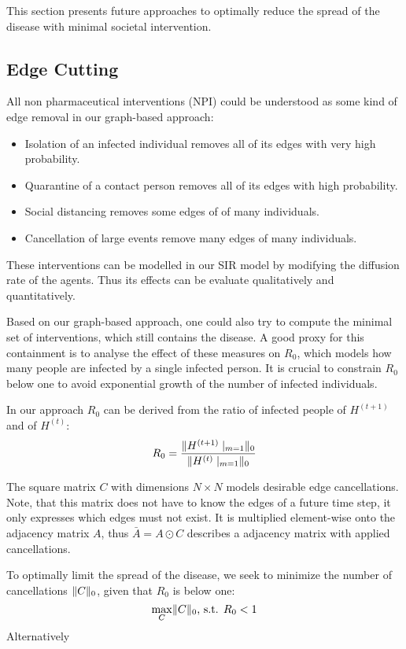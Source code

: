 This section presents future approaches to optimally reduce the spread of the disease with minimal societal intervention.

\subsection{Edge Cutting}
All non pharmaceutical interventions (NPI) could be understood as some kind of edge removal in our graph-based approach:
\begin{itemize}
	\item Isolation of an infected individual removes all of its edges with very high probability.
	\item Quarantine of a contact person removes all of its edges with high probability.
	\item Social distancing removes some edges of of many individuals.
	\item Cancellation of large events remove many edges of many individuals.
\end{itemize}
These interventions can be modelled in our SIR model by modifying the diffusion rate of the agents.
Thus its effects can be evaluate qualitatively and quantitatively.

Based on our graph-based approach, one could also try to compute the minimal set of interventions, which still contains the disease.
A good proxy for this containment is to analyse the effect of these measures on $R_0$, which models how many people are infected by a single infected person.
It is crucial to constrain $R_0$ below one to avoid exponential growth of the number of infected individuals.

In our approach $R_0$ can be derived from the ratio of infected people of $H^{(t+1)}$ and of $H^{(t)}$:
\begin{equation}
	R_0 = \frac{\norm{H^{(t+1)}\mid_{m=1}}_{0}}{\norm{H^{(t)}\mid_{m=1}}_{0}} %
\end{equation}

The square matrix $C$ with dimensions $N \times N$ models desirable edge cancellations.
Note, that this matrix does not have to know the edges of a future time step, it only expresses which edges must not exist.
It is multiplied element-wise onto the adjacency matrix $A$, thus $\bar{A} = A \odot C$ describes a adjacency matrix with applied cancellations.

To optimally limit the spread of the disease, we seek to minimize the number of cancellations $\lVert C\rVert_0$, given that $R_0$ is below one:
\begin{equation}
	\max_{C} \lVert C\rVert_0\text{, s.t. }R_0 < 1
\end{equation}
Alternatively

